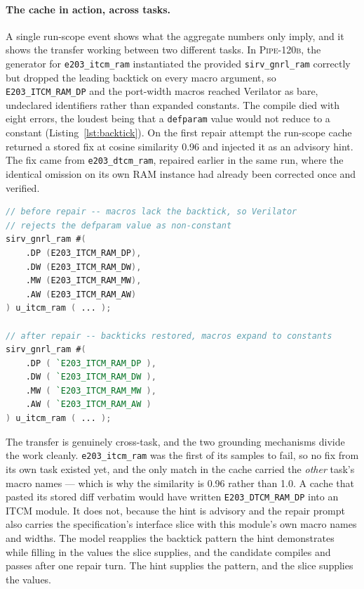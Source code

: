 \paragraph{The cache in action, across tasks.}
A single run-scope event shows what the aggregate numbers only imply, and
it shows the transfer working between two different tasks. In
\textsc{Pipe-120b}, the generator for \texttt{e203\_itcm\_ram}
instantiated the provided \texttt{sirv\_gnrl\_ram} correctly but dropped
the leading backtick on every macro argument, so
\texttt{E203\_ITCM\_RAM\_DP} and the port-width macros reached Verilator
as bare, undeclared identifiers rather than expanded constants. The
compile died with eight errors, the loudest being that a \texttt{defparam}
value would not reduce to a constant (Listing~\ref{lst:backtick}). On the
first repair attempt the run-scope cache returned a stored fix at cosine
similarity 0.96 and injected it as an advisory hint. The fix came from
\texttt{e203\_dtcm\_ram}, repaired earlier in the same run, where the
identical omission on its own RAM instance had already been corrected
once and verified.

\begin{lstlisting}[language=Verilog,caption={The missing-backtick fault
in \texttt{e203\_itcm\_ram} and the cached repair transferred from
\texttt{e203\_dtcm\_ram}. Macro arguments without the leading backtick
read as non-constant identifiers; restoring it lets them expand to their
defined depths and widths.},label={lst:backtick}]
// before repair -- macros lack the backtick, so Verilator
// rejects the defparam value as non-constant
sirv_gnrl_ram #(
    .DP (E203_ITCM_RAM_DP),
    .DW (E203_ITCM_RAM_DW),
    .MW (E203_ITCM_RAM_MW),
    .AW (E203_ITCM_RAM_AW)
) u_itcm_ram ( ... );

// after repair -- backticks restored, macros expand to constants
sirv_gnrl_ram #(
    .DP ( `E203_ITCM_RAM_DP ),
    .DW ( `E203_ITCM_RAM_DW ),
    .MW ( `E203_ITCM_RAM_MW ),
    .AW ( `E203_ITCM_RAM_AW )
) u_itcm_ram ( ... );
\end{lstlisting}

The transfer is genuinely cross-task, and the two grounding mechanisms
divide the work cleanly. \texttt{e203\_itcm\_ram} was the first of its
samples to fail, so no fix from its own task existed yet, and the only
match in the cache carried the \emph{other} task's macro names --- which
is why the similarity is 0.96 rather than 1.0. A cache that pasted its
stored diff verbatim would have written \texttt{E203\_DTCM\_RAM\_DP} into
an ITCM module. It does not, because the hint is advisory and the repair
prompt also carries the specification's interface slice with this
module's own macro names and widths. The model reapplies the backtick
pattern the hint demonstrates while filling in the values the slice
supplies, and the candidate compiles and passes after one repair turn.
The hint supplies the pattern, and the slice supplies the values.


